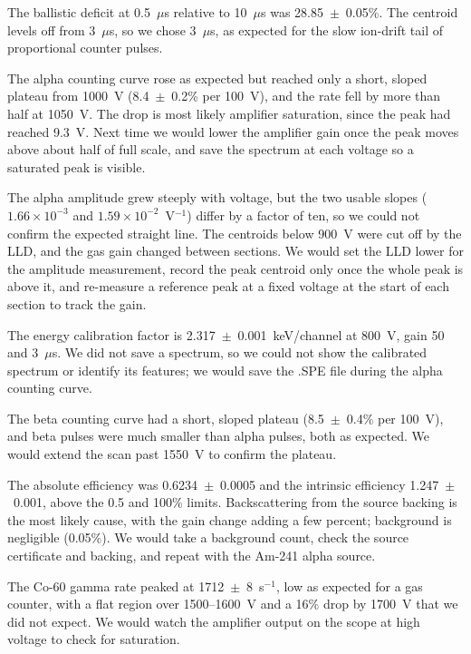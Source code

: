 \documentclass[12pt]{article}
\begin{document}
The ballistic deficit at 0.5~$\mu$s relative to 10~$\mu$s was 28.85~$\pm$~0.05\%. The centroid levels off from 3~$\mu$s, so we chose 3~$\mu$s, as expected for the slow ion-drift tail of proportional counter pulses.

The alpha counting curve rose as expected but reached only a short, sloped plateau from 1000~V (8.4~$\pm$~0.2\% per 100~V), and the rate fell by more than half at 1050~V. The drop is most likely amplifier saturation, since the peak had reached 9.3~V. Next time we would lower the amplifier gain once the peak moves above about half of full scale, and save the spectrum at each voltage so a saturated peak is visible.

The alpha amplitude grew steeply with voltage, but the two usable slopes ($1.66\times10^{-3}$ and $1.59\times10^{-2}$~V$^{-1}$) differ by a factor of ten, so we could not confirm the expected straight line. The centroids below 900~V were cut off by the LLD, and the gas gain changed between sections. We would set the LLD lower for the amplitude measurement, record the peak centroid only once the whole peak is above it, and re-measure a reference peak at a fixed voltage at the start of each section to track the gain.

The energy calibration factor is 2.317~$\pm$~0.001~keV/channel at 800~V, gain 50 and 3~$\mu$s. We did not save a spectrum, so we could not show the calibrated spectrum or identify its features; we would save the .SPE file during the alpha counting curve.

The beta counting curve had a short, sloped plateau (8.5~$\pm$~0.4\% per 100~V), and beta pulses were much smaller than alpha pulses, both as expected. We would extend the scan past 1550~V to confirm the plateau.

The absolute efficiency was 0.6234~$\pm$~0.0005 and the intrinsic efficiency 1.247~$\pm$~0.001, above the 0.5 and 100\% limits. Backscattering from the source backing is the most likely cause, with the gain change adding a few percent; background is negligible (0.05\%). We would take a background count, check the source certificate and backing, and repeat with the Am-241 alpha source.

The Co-60 gamma rate peaked at 1712~$\pm$~8~s$^{-1}$, low as expected for a gas counter, with a flat region over 1500--1600~V and a 16\% drop by 1700~V that we did not expect. We would watch the amplifier output on the scope at high voltage to check for saturation.


\end{document}
